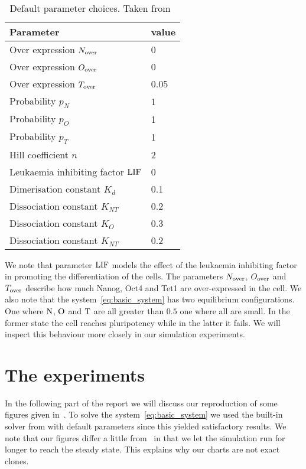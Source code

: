 \begin{table}
  \centering
   \begin{tabular}{l  l} 
   \hline
   Parameter & value \\ [0.5ex] 
   \hline\hline
   Over expression $N_\text{over}$ & 0 \\
   Over expression $O_\text{over}$ & 0 \\
   Over expression $T_\text{over}$ & 0.05 \\
   Probability $p_N$ & 1 \\
   Probability $p_O$ & 1 \\
   Probability $p_T$ & 1 \\
   Hill coefficient $n$ & 2 \\
   Leukaemia inhibiting factor $\text{LIF}$ & 0 \\
   Dimerisation constant $K_d$ & 0.1 \\
   Dissociation constant $K_{NT}$ & 0.2 \\
   Dissociation constant $K_O$ & 0.3 \\
   Dissociation constant $K_{NT}$ & 0.2
   \end{tabular}
   \caption{Default parameter choices. Taken from~\cite{Olariu2016}}
   \label{tb:params}
\end{table}
We note that parameter $\text{LIF}$ models the effect of the leukaemia inhibiting factor in promoting 
the differentiation of the cells. The parameters $N_\text{over}$, $O_\text{over}$ and $T_\text{over}$ describe how much
Nanog, Oct4 and Tet1 are over-expressed in the cell.
We also note that the system~\eqref{eq:basic_system} has two equilibrium configurations.
One where $\text{N}$, $\text{O}$ and $\text{T}$ are all greater than $0.5$ one where all are small. 
In the former state the cell reaches pluripotency while in the latter it fails. We will inspect
this behaviour more closely in our simulation experiments.

\section{The experiments}

In the following part of the report we will discuss our reproduction of some figures given in~\cite{Olariu2016}.
To solve the system~\eqref{eq:basic_system} we used the built-in solver from  with default parameters since this yielded satisfactory results.
We note that our figures differ a little from~\cite{Olariu2016} in that we let the simulation run
for longer to reach the steady state. This explains why our charts are not exact clones.

